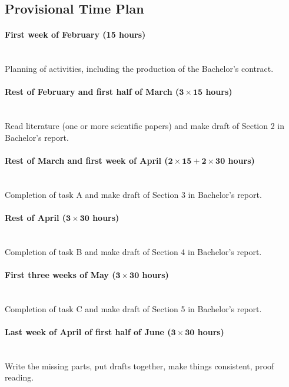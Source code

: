 \documentclass{article}
\newcommand{\timeest}[1]{$\mathbf{#1}$}%
\begin{document}
\subsection*{Provisional Time Plan}

\paragraph{First week of February (15 hours)}~\\\noindent
Planning of activities, including the production of the Bachelor's contract.

\paragraph{Rest of February and first half of March (\timeest{3\times 15} hours)}~\\\noindent
Read literature (one or more scientific papers) and make draft of Section 2 in Bachelor's report.

\paragraph{Rest of March and first week of April (\timeest{2\times 15+2\times 30} hours)}~\\\noindent
Completion of task A and make draft of Section 3 in Bachelor's report.

\paragraph{Rest of April (\timeest{3\times 30} hours)}~\\\noindent
Completion of task B and make draft of Section 4 in Bachelor's report.

\paragraph{First three weeks of May (\timeest{3\times 30} hours)}~\\\noindent
Completion of task C and make draft of Section 5 in Bachelor's report.

\paragraph{Last week of April of first half of June (\timeest{3\times 30} hours)}~\\\noindent
Write the missing parts, put drafts together, make things consistent, proof reading.
\end{document}

